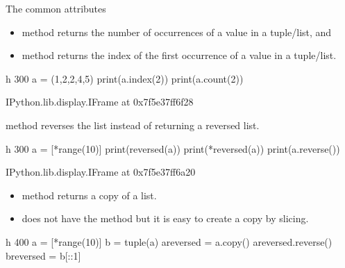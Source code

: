 \documentclass[letterpaper,10pt,english]{sphinxmanual}
\begin{document}
The common attributes
\begin{itemize}
\item {} 
 method returns the number of occurrences of a value in a tuple/list, and

\item {} 
 method returns the index of the first occurrence of a value in a tuple/list.

\end{itemize}

\begin{sphinxVerbatim}[commandchars=\\\{\}]
 \PYGZhy{}h 300
a = (1,2,2,4,5)
print(a.index(2))
print(a.count(2))
\end{sphinxVerbatim}

\begin{sphinxVerbatim}[commandchars=\\\{\}]
\PYGZlt{}IPython.lib.display.IFrame at 0x7f5e37ff6f28\PYGZgt{}
\end{sphinxVerbatim}

 method reverses the list instead of returning a reversed list.

\begin{sphinxVerbatim}[commandchars=\\\{\}]
 \PYGZhy{}h 300
a = [*range(10)]
print(reversed(a))
print(*reversed(a))
print(a.reverse())
\end{sphinxVerbatim}

\begin{sphinxVerbatim}[commandchars=\\\{\}]
\PYGZlt{}IPython.lib.display.IFrame at 0x7f5e37ff6a20\PYGZgt{}
\end{sphinxVerbatim}
\begin{itemize}
\item {} 
 method returns a copy of a list.

\item {} 
 does not have the  method but it is easy to create a copy by slicing.

\end{itemize}

\begin{sphinxVerbatim}[commandchars=\\\{\}]
 \PYGZhy{}h 400
a = [*range(10)]
b = tuple(a)
a\PYGZus{}reversed = a.copy()
a\PYGZus{}reversed.reverse()
b\PYGZus{}reversed = b[::\PYGZhy{}1]
\end{sphinxVerbatim}
\end{document}
